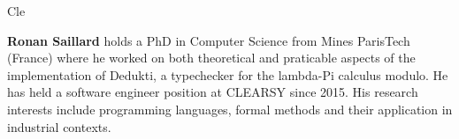 \begin{sitedescription}{Cle}
\begin{compactitem}
\item\textbf{Ronan Saillard} holds a PhD in Computer Science from Mines ParisTech (France) where he worked on both theoretical and praticable 
aspects of the implementation of Dedukti, a typechecker for the lambda-Pi calculus modulo. He has held a software engineer position at 
CLEARSY since 2015. His research interests include programming languages, formal methods and their application in industrial contexts.
\end{compactitem}

\end{sitedescription}

